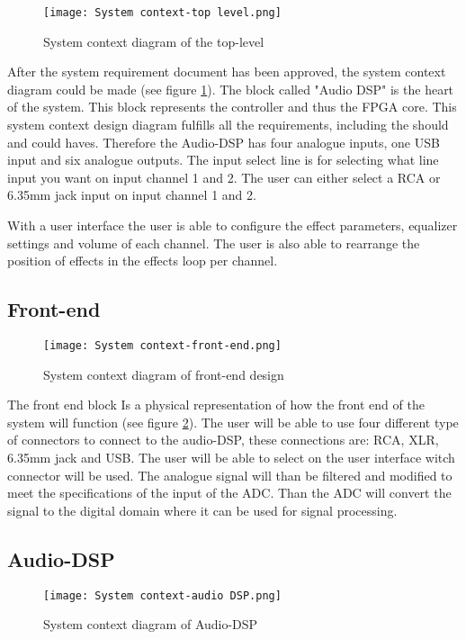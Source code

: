 \begin{figure}[ht]
    \texttt{[image: System context-top level.png]}
    \caption{System context diagram of the top-level}
    \label{fig:sys-context-top}
\end{figure}

After the system requirement document has been approved, the system context diagram could be made (see figure \ref{fig:sys-context-top}). The block called "Audio DSP" is the heart of the system. This block represents the controller and thus the FPGA core. This system context design diagram fulfills all the requirements, including the should and could haves. Therefore the Audio-DSP has four analogue inputs, one USB input and six analogue outputs. The input select line is for selecting what line input you want on input channel 1 and 2. The user can either select a RCA or 6.35mm jack input on input channel 1 and 2.

With a user interface the user is able to configure the effect parameters, equalizer settings and volume of each channel. The user is also able to rearrange the position of effects in the effects loop per channel.

\subsection{Front-end}
\begin{figure}[ht]
    \texttt{[image: System context-front-end.png]}
    \caption{System context diagram of front-end design}
    \label{fig:system-context-front-end}
\end{figure}

The front end block Is a physical representation of how the front end of the system will function (see figure \ref{fig:system-context-front-end}). The user will be able to use four different type of connectors to connect to the audio-DSP, these connections are: RCA, XLR, 6.35mm jack and USB. The user will be able to select on the user interface witch connector will be used. The analogue signal will than be filtered and modified to meet the specifications of the input of the ADC. Than the ADC will convert the signal to the digital domain where it can be used for signal processing. 

\subsection{Audio-DSP}
\begin{figure}[ht]
    \texttt{[image: System context-audio DSP.png]}
    \caption{System context diagram of Audio-DSP}
    \label{fig:sys-context-audio-dsp}
\end{figure}

